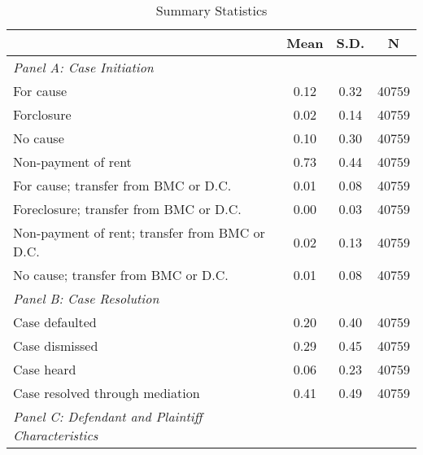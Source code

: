 \begin{table}[htbp]\centering
\def\sym#1{\ifmmode^{#1}\else\(^{#1}\)\fi}
\caption{Summary Statistics}
\begin{tabular}{l*{1}{ccc}}
\toprule
                    &        Mean&        S.D.&           N\\
\midrule
\emph{Panel A: Case Initiation}&            &            &            \\
\hspace{0.25cm}For cause&        0.12&        0.32&       40759\\
\hspace{0.25cm}Forclosure&        0.02&        0.14&       40759\\
\hspace{0.25cm}No cause&        0.10&        0.30&       40759\\
\hspace{0.25cm}Non-payment of rent&        0.73&        0.44&       40759\\
\hspace{0.25cm}For cause; transfer from BMC or D.C.&        0.01&        0.08&       40759\\
\hspace{0.25cm}Foreclosure; transfer from BMC or D.C.&        0.00&        0.03&       40759\\
\hspace{0.25cm}Non-payment of rent; transfer from BMC or D.C.&        0.02&        0.13&       40759\\
\hspace{0.25cm}No cause; transfer from BMC or D.C.&        0.01&        0.08&       40759\\
\emph{Panel B: Case Resolution}&            &            &            \\
\hspace{0.25cm}Case defaulted&        0.20&        0.40&       40759\\
\hspace{0.25cm}Case dismissed&        0.29&        0.45&       40759\\
\hspace{0.25cm}Case heard&        0.06&        0.23&       40759\\
\hspace{0.25cm}Case resolved through mediation&        0.41&        0.49&       40759\\
\emph{Panel C: Defendant and Plaintiff Characteristics}&            &            &            \\

\end{tabular}
\end{table}
